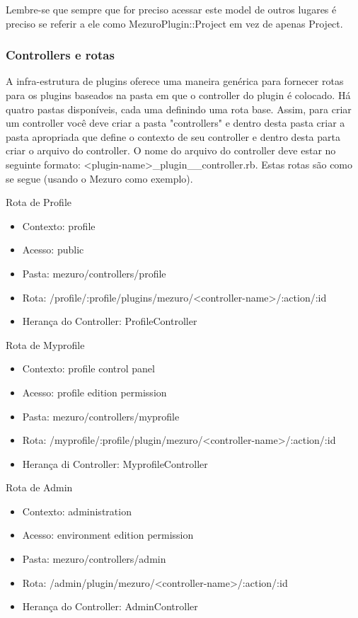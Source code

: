 \documentclass[11pt]{article}
\begin{document}
Lembre-se que sempre que for preciso acessar este model de outros lugares é
preciso se referir a ele como MezuroPlugin::Project em vez de apenas Project.

\subsubsection{Controllers e rotas}

A infra-estrutura de plugins oferece uma maneira genérica para fornecer rotas
para os plugins baseados na pasta em que o controller do plugin é colocado. Há
quatro pastas disponíveis, cada uma definindo uma rota base. Assim, para criar
um controller você deve criar a pasta "controllers" e dentro desta pasta criar
a pasta apropriada que define o contexto de seu controller e dentro desta
parta criar o arquivo do controller. O nome do arquivo do controller deve
estar no seguinte formato:
<plugin-name>\_plugin\_<desired-controller>\_controller.rb. Estas rotas são como
se segue (usando o Mezuro como exemplo).

Rota de Profile
\begin{itemize}
  \item Contexto: profile
  \item Acesso: public
  \item Pasta: mezuro/controllers/profile
  \item Rota: /profile/:profile/plugins/mezuro/<controller-name>/:action/:id
  \item Herança do Controller: ProfileController
\end{itemize}

Rota de Myprofile
\begin{itemize}
  \item Contexto: profile control panel
  \item Acesso: profile edition permission
  \item Pasta: mezuro/controllers/myprofile
  \item Rota: /myprofile/:profile/plugin/mezuro/<controller-name>/:action/:id
  \item Herança di Controller: MyprofileController
\end{itemize}

Rota de Admin
\begin{itemize}
  \item Contexto: administration
  \item Acesso: environment edition permission
  \item Pasta: mezuro/controllers/admin
  \item Rota: /admin/plugin/mezuro/<controller-name>/:action/:id
  \item Herança do Controller: AdminController
\end{itemize}
\end{document}
